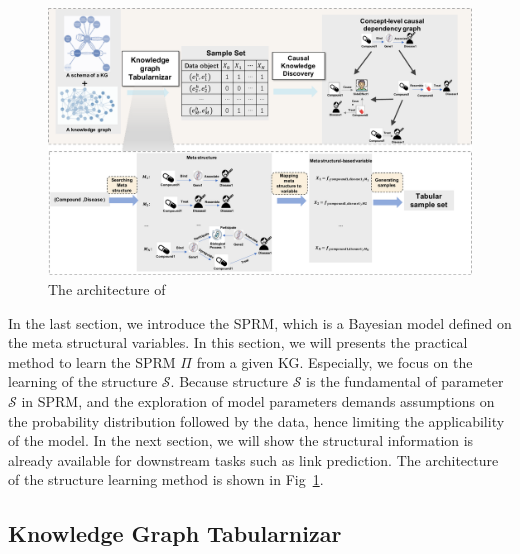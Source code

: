 \begin{figure}[htbp]
\begin{center}
\includegraphics[width=18cm]{submissions/causal-meta-knowledge/figures/framework.pdf}
\end{center}
\caption{The architecture of~\dname}
\label{fig:framwork}
\end{figure}
In the last section, we introduce the SPRM, which is a Bayesian model defined on the meta structural variables.
In this section, we will presents the practical method to learn the SPRM $\Pi$ from a given KG.
Especially, we focus on the learning of the structure $\mathcal{S}$.
Because structure $\mathcal{S}$ is the fundamental of parameter $\mathcal{S}$ in SPRM, and the exploration of model parameters demands assumptions on the probability distribution followed by the data, hence limiting the applicability of the model.
In the next section, we will show the structural information is already available for downstream tasks such as link prediction.
The architecture of the structure learning method is shown in Fig~\ref{fig:framwork}.


\subsection{Knowledge Graph Tabularnizar}


